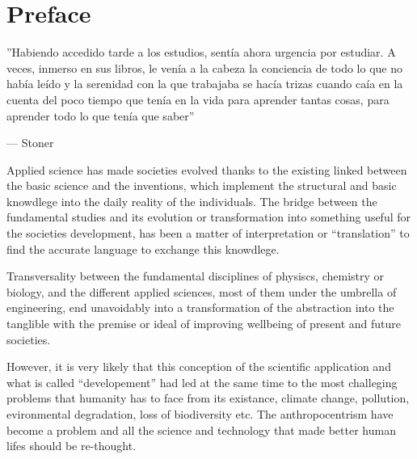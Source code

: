 \chapter*{Preface\label{cha:preface}}

\epigraphfontsize{\small\itshape}
\epigraph{''Habiendo accedido tarde a los estudios, sentía ahora urgencia por estudiar. A veces, inmerso en sus libros, le venía a la cabeza la conciencia de todo lo que no había leído y la serenidad con la que trabajaba se hacía trizas cuando caía en la cuenta del poco tiempo que tenía en la vida para aprender tantas cosas, para aprender todo lo que tenía que saber''}{--- \textup{Stoner}}

Applied science has made societies evolved thanks to the existing linked between the basic science and the inventions, which implement the structural and basic knowdlege into the daily reality of the individuals. The bridge between the fundamental studies and its evolution or transformation into something useful for the societies development, has been a matter of interpretation or ``translation'' to find the accurate language to exchange this knowdlege.


Transversality between the fundamental disciplines of physiscs, chemistry or biology, and the different applied sciences, most of them under the umbrella of engineering, end unavoidably into a transformation of the abstraction into the tanglible with the premise or ideal of improving wellbeing of present and future societies.


However, it is very likely that this conception of the scientific application and what is called ``developement'' had led at the same time to the most challeging problems that humanity has to face from its existance, climate change, pollution, evironmental degradation, loss of biodiversity etc. The anthropocentrism have become a problem and all the science and technology that made better human lifes should be re-thought.


